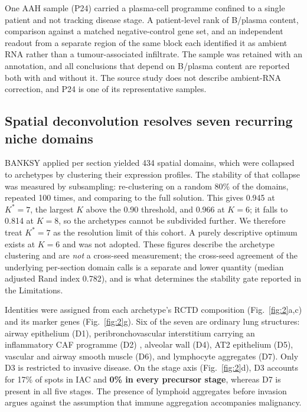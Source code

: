 One AAH sample (P24) carried a plasma-cell programme confined to a single patient and not
tracking disease stage. A patient-level rank of B/plasma content, comparison against a
matched negative-control gene set, and an independent readout from a separate region of the
same block each identified it as ambient RNA rather than a tumour-associated infiltrate. The
sample was retained with an annotation, and all conclusions that depend on B/plasma content
are reported both with and without it. The source study does not describe ambient-RNA
correction, and P24 is one of its representative samples.



\subsection{Spatial deconvolution resolves seven recurring niche domains}

BANKSY applied per section yielded 434 spatial domains, which were collapsed to archetypes
by clustering their expression profiles. The stability of that collapse was measured by
subsampling: re-clustering on a random 80\% of the domains, repeated 100 times, and
comparing to the full solution. This gives 0.945 at $K^{*}=7$, the largest $K$ above the
0.90 threshold, and 0.966 at $K=6$; it falls to 0.814 at $K=8$, so the archetypes cannot be
subdivided further. We therefore treat $K^{*}=7$ as the resolution limit of this cohort. A
purely descriptive optimum exists at $K=6$ and was not adopted. These figures describe the
archetype clustering and are \emph{not} a cross-seed measurement; the cross-seed agreement
of the underlying per-section domain calls is a separate and lower quantity (median
adjusted Rand index 0.782), and is what determines the stability gate reported in the
Limitations.

Identities were assigned from each archetype's RCTD composition (Fig.~\ref{fig:2}a,c) and
its marker genes (Fig.~\ref{fig:2}g). Six of the seven are ordinary lung structures: airway
epithelium (D1), peribronchovascular interstitium carrying an inflammatory CAF programme
(D2) \citep{ohllund2017,elyada2019}, alveolar wall (D4), AT2 epithelium (D5), vascular and
airway smooth muscle (D6), and lymphocyte aggregates (D7). Only D3 is restricted to
invasive disease. On the stage axis (Fig.~\ref{fig:2}d), D3 accounts for 17\% of spots in
IAC and \textbf{0\% in every precursor stage}, whereas D7 is present in all five stages.
The presence of lymphoid aggregates before invasion argues against the assumption that
immune aggregation accompanies malignancy.

